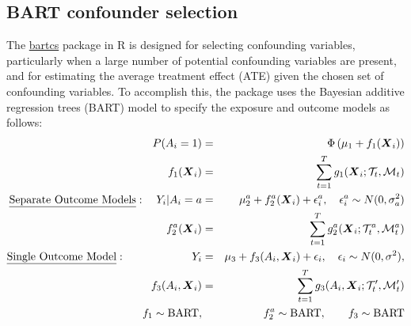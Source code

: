 \subsection{BART confounder selection}
The \href{https://CRAN.R-project.org/package=bartcs}{bartcs} package in R is designed for selecting confounding variables, particularly when a large number of potential confounding variables are present, and for estimating the average treatment effect (ATE) given the chosen set of confounding variables. To accomplish this, the package uses the Bayesian additive regression trees (BART) model to specify the exposure and outcome models as follows:
%
\begin{eqnarray}
P(A_i=1) &=& \Phi\left(\mu_1+f_1(\boldsymbol{X}_i)\right) \label{eq1}\\
f_1(\boldsymbol{X}_i) &=&  \sum_{t=1}^T g_1(\boldsymbol{X}_i ; \mathcal{T}_t, \mathcal{M}_t) \nonumber\\
\text{\underline{Separate Outcome Models}}: \quad  Y_i | A_i =a &=&  \mu_2^a + f_2^a(\boldsymbol{X}_i)+ \epsilon_i^a, \quad \epsilon_i^a \sim N(0, \sigma_a^2) \label{eq2}\\
f_2^a(\boldsymbol{X}_i) &=&  \sum_{t=1}^T g_2^a(\boldsymbol{X}_i ; \mathcal{T}_t^a, \mathcal{M}_t^a) \nonumber\\
\text{\underline{Single Outcome Model}}: \qquad \qquad  \qquad Y_i & = & \mu_3 +  f_3(A_i, \boldsymbol{X}_i)+ \epsilon_i, \quad \epsilon_i \sim N(0, \sigma^2), \label{eq3} \\
f_3(A_i, \boldsymbol{X}_i) & = & \sum_{t=1}^T g_3(A_i, \boldsymbol{X}_i ; \mathcal{T}_t^\prime, \mathcal{M}_t^\prime) \nonumber\\
f_1  \sim  \text{BART} ,&& f_2^a  \sim  \text{BART},  \qquad  f_3  \sim  \text{BART} \nonumber
\end{eqnarray}
%
